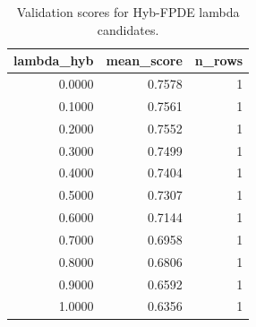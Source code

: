 \begin{table}[t]
\caption{Validation scores for Hyb-FPDE lambda candidates.}
\label{tab:lambda_distribution_computed}
\centering
\begin{tabular}{rrr}
\toprule
lambda\_hyb & mean\_score & n\_rows \\
\midrule
0.0000 & 0.7578 & 1 \\
0.1000 & 0.7561 & 1 \\
0.2000 & 0.7552 & 1 \\
0.3000 & 0.7499 & 1 \\
0.4000 & 0.7404 & 1 \\
0.5000 & 0.7307 & 1 \\
0.6000 & 0.7144 & 1 \\
0.7000 & 0.6958 & 1 \\
0.8000 & 0.6806 & 1 \\
0.9000 & 0.6592 & 1 \\
1.0000 & 0.6356 & 1 \\
\bottomrule
\end{tabular}

\end{table}
